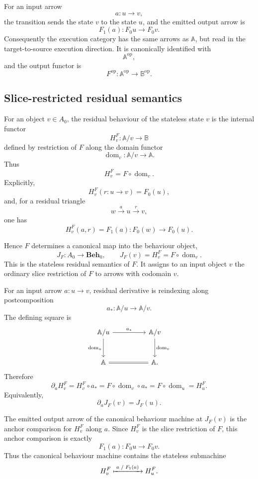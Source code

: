 For an input arrow
\[
    a:u\to v,
\]
the transition sends the state \(v\) to the state \(u\), and the emitted output
arrow is
\[
    F_1(a):F_0u\to F_0v.
\]
Consequently the execution category has the same arrows as \(\mathbb A\), but
read in the target-to-source execution direction. It is canonically identified
with
\[
    \mathbb A^{\mathrm{op}},
\]
and the output functor is
\[
    F^{\mathrm{op}}:\mathbb A^{\mathrm{op}}\to\mathbb B^{\mathrm{op}}.
\]

\subsection{Slice-restricted residual semantics}
\label{subsec:stateless-slice-residual-semantics}

For an object \(v\in A_0\), the residual behaviour of the stateless state \(v\)
is the internal functor
\[
    H^F_v:\mathbb A/v\to\mathbb B
\]
defined by restriction of \(F\) along the domain functor
\[
    \operatorname{dom}_v:\mathbb A/v\to\mathbb A.
\]
Thus
\[
    H^F_v=F\circ\operatorname{dom}_v.
\]
Explicitly,
\[
    H^F_v(r:u\to v)=F_0(u),
\]
and, for a residual triangle
\[
    w\xrightarrow{a}u\xrightarrow{r}v,
\]
one has
\[
    H^F_v(a,r)=F_1(a):F_0(w)\to F_0(u).
\]

Hence \(F\) determines a canonical map into the behaviour object,
\[
    J_F:A_0\to\mathbf{Beh}_0,
    \qquad
    J_F(v)=H^F_v=F\circ\operatorname{dom}_v.
\]
This is the stateless residual semantics of \(F\). It assigns to an input
object \(v\) the ordinary slice restriction of \(F\) to arrows with codomain
\(v\).

For an input arrow \(a:u\to v\), residual derivative is reindexing along
postcomposition
\[
    a_*:\mathbb A/u\to\mathbb A/v.
\]
The defining square is
\[
    \begin{tikzcd}[column sep=huge, row sep=large]
            \mathbb A/u
                \arrow[r, "a_*"]
                \arrow[d, "\operatorname{dom}_u"']
        &
            \mathbb A/v
                \arrow[d, "\operatorname{dom}_v"]
        \\
            \mathbb A
                \arrow[r, equal]
        &
            \mathbb A.
    \end{tikzcd}
\]
Therefore
\[
    \partial_aH^F_v
    =
    H^F_v\circ a_*
    =
    F\circ\operatorname{dom}_v\circ a_*
    =
    F\circ\operatorname{dom}_u
    =
    H^F_u.
\]
Equivalently,
\[
    \partial_aJ_F(v)=J_F(u).
\]

The emitted output arrow of the canonical behaviour machine at \(J_F(v)\) is
the anchor comparison for \(H^F_v\) along \(a\). Since \(H^F_v\) is the slice
restriction of \(F\), this anchor comparison is exactly
\[
    F_1(a):F_0u\to F_0v.
\]
Thus the canonical behaviour machine contains the stateless submachine
\[
    H^F_v
        \xmapsto{\;a\;/\;F_1(a)\;}
    H^F_u.
\]


